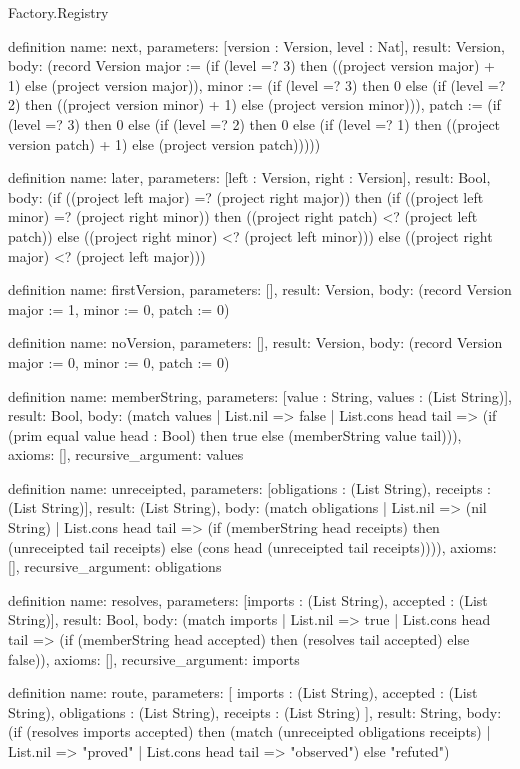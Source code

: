 \begin{lexlean}{Factory.Registry}
\begin{semanticmodule}
definition{
  name: next,
  parameters: [version : Version, level : Nat],
  result: Version,
  body: (record Version {major := (if (level =? 3) then ((project version major) + 1) else (project version major)), minor := (if (level =? 3) then 0 else (if (level =? 2) then ((project version minor) + 1) else (project version minor))), patch := (if (level =? 3) then 0 else (if (level =? 2) then 0 else (if (level =? 1) then ((project version patch) + 1) else (project version patch))))})
}

definition{
  name: later,
  parameters: [left : Version, right : Version],
  result: Bool,
  body: (if ((project left major) =? (project right major)) then (if ((project left minor) =? (project right minor)) then ((project right patch) <? (project left patch)) else ((project right minor) <? (project left minor))) else ((project right major) <? (project left major)))
}

definition{
  name: firstVersion,
  parameters: [],
  result: Version,
  body: (record Version {major := 1, minor := 0, patch := 0})
}

definition{
  name: noVersion,
  parameters: [],
  result: Version,
  body: (record Version {major := 0, minor := 0, patch := 0})
}

definition{
  name: memberString,
  parameters: [value : String, values : (List String)],
  result: Bool,
  body: (match values
    | List.nil => false
    | List.cons head tail => (if (prim equal value head : Bool) then true else (memberString value tail))),
  axioms: [],
  recursive_argument: values
}

definition{
  name: unreceipted,
  parameters: [obligations : (List String), receipts : (List String)],
  result: (List String),
  body: (match obligations
    | List.nil => (nil String)
    | List.cons head tail => (if (memberString head receipts) then (unreceipted tail receipts) else (cons head (unreceipted tail receipts)))),
  axioms: [],
  recursive_argument: obligations
}

definition{
  name: resolves,
  parameters: [imports : (List String), accepted : (List String)],
  result: Bool,
  body: (match imports
    | List.nil => true
    | List.cons head tail => (if (memberString head accepted) then (resolves tail accepted) else false)),
  axioms: [],
  recursive_argument: imports
}

definition{
  name: route,
  parameters: [
    imports : (List String),
    accepted : (List String),
    obligations : (List String),
    receipts : (List String)
  ],
  result: String,
  body: (if (resolves imports accepted) then (match (unreceipted obligations receipts)
    | List.nil => "proved"
    | List.cons head tail => "observed") else "refuted")
}


\end{semanticmodule}
\end{lexlean}

